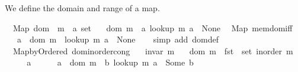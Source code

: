 \begin{isabellebody}
%
\isadelimproof
%
\endisadelimproof
%
\begin{isamarkuptext}%
We define the domain and range of a map.%
\end{isamarkuptext}\isamarkuptrue%
\isamarkupfalse%
\ {\isacharparenleft}{\kern0pt}\ Map{\isacharparenright}{\kern0pt}\ dom\ {\isacharcolon}{\kern0pt}{\isacharcolon}{\kern0pt}\ {\isachardoublequoteopen}{\isacharprime}{\kern0pt}m\ {\isasymRightarrow}\ {\isacharprime}{\kern0pt}a\ set{\isachardoublequoteclose}\ \isanewline
\ \ {\isachardoublequoteopen}dom\ m\ {\isasymequiv}\ {\isacharbraceleft}{\kern0pt}a{\isachardot}{\kern0pt}\ lookup\ m\ a\ {\isasymnoteq}\ None{\isacharbraceright}{\kern0pt}{\isachardoublequoteclose}\isanewline
%
\isadeliminvisible
\isanewline
%
\endisadeliminvisible
%
\isataginvisible
{}\isamarkupfalse%
\ {\isacharparenleft}{\kern0pt}\ Map{\isacharparenright}{\kern0pt}\ mem{\isacharunderscore}{\kern0pt}dom{\isacharunderscore}{\kern0pt}iff{\isacharcolon}{\kern0pt}\isanewline
\ \ \ {\isachardoublequoteopen}a\ {\isasymin}\ dom\ m\ {\isasymlongleftrightarrow}\ lookup\ m\ a\ {\isasymnoteq}\ None{\isachardoublequoteclose}%
\endisataginvisible
{\isafoldinvisible}%
%
\isadeliminvisible
\isanewline
%
\endisadeliminvisible
%
\isadelimproof
\ \ %
\endisadelimproof
%
\isatagproof
{}\isamarkupfalse%
\ {\isacharparenleft}{\kern0pt}simp\ add{\isacharcolon}{\kern0pt}\ dom{\isacharunderscore}{\kern0pt}def{\isacharparenright}{\kern0pt}%
\endisatagproof
{\isafoldproof}%
%
\isadelimproof
\isanewline
%
\endisadelimproof
\isanewline
{}\isamarkupfalse%
\ {\isacharparenleft}{\kern0pt}\ Map{\isacharunderscore}{\kern0pt}by{\isacharunderscore}{\kern0pt}Ordered{\isacharparenright}{\kern0pt}\ dom{\isacharunderscore}{\kern0pt}inorder{\isacharunderscore}{\kern0pt}cong{\isacharcolon}{\kern0pt}\isanewline
\ \ \ {\isachardoublequoteopen}invar\ m{\isachardoublequoteclose}\isanewline
\ \ \ {\isachardoublequoteopen}dom\ m\ {\isacharequal}{\kern0pt}\ fst\ {\isacharbackquote}{\kern0pt}\ set\ {\isacharparenleft}{\kern0pt}inorder\ m{\isacharparenright}{\kern0pt}{\isachardoublequoteclose}\isanewline
%
\isadelimproof
%
\endisadelimproof
%
\isatagproof
{}\isamarkupfalse%
\ {\isacharminus}{\kern0pt}\isanewline
\ \ \isacommand{{\isacharbraceleft}{\kern0pt}}\isamarkupfalse%
\ \isamarkupfalse%
\ a\isanewline
\ \ \ \ \isamarkupfalse%
\ {\isachardoublequoteopen}a\ {\isasymin}\ dom\ m\ {\isasymlongleftrightarrow}\ {\isacharparenleft}{\kern0pt}{\isasymexists}b{\isachardot}{\kern0pt}\ lookup\ m\ a\ {\isacharequal}{\kern0pt}\ Some\ b{\isacharparenright}{\kern0pt}{\isachardoublequoteclose}\isanewline

\end{isabellebody}
